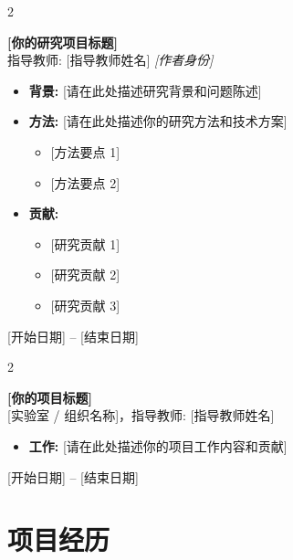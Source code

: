 \documentclass[10pt, letterpaper]{article}
\newenvironment{highlights}{
    \begin{itemize}[
        topsep=0.10 cm,
        parsep=0.10 cm,
        partopsep=0pt,
        itemsep=0pt,
        leftmargin=0.4 cm + 10pt
    ]
}{\end{itemize}} %
\newenvironment{twocolentry}[2][]{\onecolentry
    \def\secondColumn{#2}
    \setcolumnwidth{\fill, 4.5 cm}
    \begin{paracol}{2}
}{\switchcolumn \raggedleft \secondColumn
    \end{paracol}
    \endonecolentry} %
\begin{document}
        \begin{twocolentry}{
            [你的研究地点]

        [开始日期] -- [结束日期]
        }
            \textbf{[你的研究项目标题]} \\
            {\small\textcolor{softGray}{指导教师: [指导教师姓名]}} \hfill \textit{[作者身份]}
            \begin{highlights}
                \item \textbf{背景:} [请在此处描述研究背景和问题陈述]
                \item \textbf{方法:} [请在此处描述你的研究方法和技术方案]
                \begin{itemize}[topsep=0.05cm, parsep=0pt, itemsep=0pt, leftmargin=*]
                    \item {[方法要点 1]}
                    \item {[方法要点 2]}
                \end{itemize}
                \item \textbf{贡献:}
                \begin{itemize}[topsep=0.05cm, parsep=0pt, itemsep=0pt, leftmargin=*]
                    \item {[研究贡献 1]}
                    \item {[研究贡献 2]}
                    \item {[研究贡献 3]}
                \end{itemize}
            \end{highlights}
        \end{twocolentry}

        \vspace{0.2 cm}

        \begin{twocolentry}{
            [你的研究地点]

        [开始日期] -- [结束日期]
        }
            \textbf{[你的项目标题]} \\
            {\small\textcolor{softGray}{[实验室 / 组织名称]，指导教师: [指导教师姓名]}}
            \begin{highlights}
                \item \textbf{工作:} [请在此处描述你的项目工作内容和贡献]
            \end{highlights}
        \end{twocolentry}


    \section{项目经历}
\end{document}
